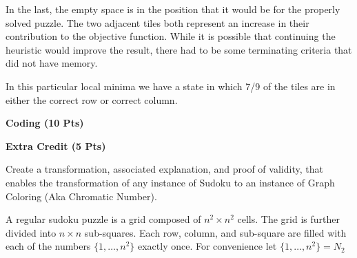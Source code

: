 \documentclass[12pt,letterpaper]{exam}
\begin{document}
\begin{questions}
\begin{parts}
\begin{solution}
			In the last, the empty space is in the position that it would be for the properly solved puzzle.
			The two adjacent tiles both represent an increase in their contribution to the objective function.
			While it is possible that continuing the heuristic would improve the result,
			there had to be some terminating criteria that did not have memory.
			
			In this particular local minima we have a state in which 7/9 of the tiles are in 
			either the correct row or correct column. 
			
		\end{solution}
		
	\end{parts}
	
	
	\question %
	\textbf{\large Coding (10 Pts)}
	
	\clearpage
	
	\question %
	\textbf{\large Extra Credit (5 Pts)}
	\begin{subparts}
		\subpart
		Create a transformation, associated explanation, and proof of validity, 
		that enables the transformation of any instance of Sudoku to an 
		instance of Graph Coloring (Aka Chromatic Number).
	\end{subparts}
	\begin{solution}
		A regular sudoku puzzle is a grid composed of \(n^2\times n^2\) cells.
		The grid is further divided into \(n\times n\) sub-squares.
		Each row, column, and sub-square are filled with each of the numbers 
		\(\{1,\ldots,n^2\}\) exactly once.
		For convenience let \(\{1,\ldots,n^2\} = N_2\)
		

\end{solution}
\end{questions}
\end{document}
